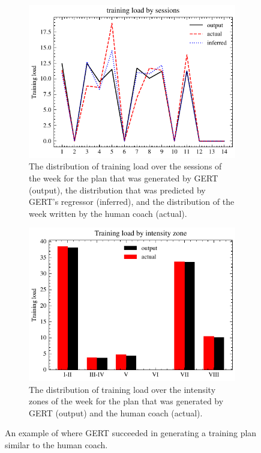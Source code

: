 \begin{figure}[ht]
    \centering
    \begin{subfigure}[t]{0.7\textwidth}
        \centering
        \includegraphics[width=\textwidth]{chapters/figures/result_examples/good_dist.pdf}
        \captionsetup{width=.9\linewidth}
        \caption{The distribution of training load over the sessions of the week for the plan that was generated by GERT (output), the distribution that was predicted by GERT's regressor (inferred), and the distribution of the week written by the human coach (actual).}
    \end{subfigure}%

    \begin{subfigure}[t]{0.7\textwidth}
        \centering
        \includegraphics[width=\textwidth]{chapters/figures/result_examples/good_zone.pdf}
        \captionsetup{width=.9\linewidth}
        \caption{The distribution of training load over the intensity zones of the week for the plan that was generated by GERT (output) and the human coach (actual).}
    \end{subfigure}
    \caption{An example of where GERT succeeded in generating a training plan similar to the human coach.}
\end{figure}
